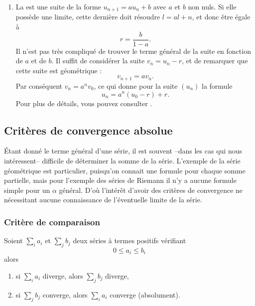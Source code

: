 \begin{example}
\begin{enumerate}
\item La  est une suite de la forme \( u_{n+1}=au_n+b\) avec \( a\) et \( b\) non nuls. Si elle possède une limite, cette dernière doit résoudre \( l=al+n\), et donc être égale à 
    \begin{equation}
        r=\frac{ b }{ 1-a }.
    \end{equation}
    Il n'est pas très compliqué de trouver le terme général de la suite en fonction de \( a\) et de \( b\). Il suffit de considérer la suite \( v_n=u_n-r\), et de remarquer que cette suite est géométrique :
    \begin{equation}
        v_{n+1}=av_n.
    \end{equation}
    Par conséquent \( v_n=a^nv_0\), ce qui donne pour la suite \( (u_n)\) la formule
    \begin{equation}
        u_n=a^n(u_0-r)+r.
    \end{equation}
    Pour plus de détails, vous pouvez consulter \cite{QXuqdoo}.

\end{enumerate}
\end{example}

\subsection{Critères de convergence absolue}

  Étant donné le terme général d'une série, il est souvent --dans les cas qui nous intéressent-- difficile de déterminer la somme de la série. L'exemple de la série géométrique est particulier, puisqu'on connait une formule pour chaque somme partielle, mais pour l'exemple des séries de Riemann il n'y a aucune formule simple pour un $\alpha$ général. D'où l'intérêt d'avoir des critères de convergence ne nécessitant aucune connaissance de l'éventuelle limite de la série.

\subsubsection{Critère de comparaison} 

\begin{lemma}   \label{LemgHWyfG}
Soient $\sum_i a_i$ et $\sum_j
b_j$ deux séries à termes positifs vérifiant
\begin{equation*}
  0 \leq a_i \leq b_i
\end{equation*}
alors
\begin{enumerate}
\item si $\sum_i a_i$ diverge, alors $\sum_j b_j$ diverge,
\item si $\sum_j b_j$ converge, alors $\sum_i a_i$ converge
  (absolument).
  \end{enumerate}
\end{lemma}

